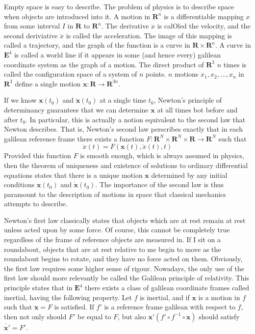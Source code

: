 Empty space is easy to describe. The problem of physics is to describe space when objects are introduced into it. A motion in $\mathbf{R}^n$ is a differentiable mapping $x$ from some interval $I$ in $\mathbf{R}$ to $\mathbf{R}^n$. The derivative $\dot{x}$ is calOled the velocity, and the second deriviative $\ddot{x}$ is called the acceleration. The image of this mapping is called a trajectory, and the graph of the function is a curve in $\mathbf{R} \times \mathbf{R}^n$. A curve in $\mathbf{E}^4$ is called a world line if it appears in some (and hence every) galilean coordinate system as the graph of a motion. The direct product of $\mathbf{R}^3$ $n$ times is called the configuration space of a system of $n$ points. $n$ motions $x_1, x_2, \dots, x_n$ in $\mathbf{R}^3$ define a single motion $\mathbf{x}:\mathbf{R} \to \mathbf{R}^{3n}$.

If we know $\mathbf{x}(t_0)$ and $\dot{\mathbf{x}}(t_0)$ at a single time $t_0$, Newton's principle of determinancy guarantees that we can determine $\mathbf{x}$ at all times bot before and after $t_0$. In particular, this is actually a notion equivalent to the second law that Newton describes. That is, Newton's second law perscribes exactly that in each galilean reference frame there exists a function $F:\mathbf{R}^N \times \mathbf{R}^N \times \mathbf{R} \to \mathbf{R}^N$ such that
%
\[ \ddot{x}(t) = F(\mathbf{x}(t), \dot{x}(t), t) \]
%
Provided this function $F$ is smooth enough, which is always assumed in physics, then the theorem of uniqueness and existence of solutions to ordinary differential equations states that there is a unique motion $\mathbf{x}$ determined by any initial conditions $\mathbf{x}(t_0)$ and $\dot{\mathbf{x}}(t_0)$. The importance of the second law is thus paramount to the description of motions in space that classical mechanics attempts to describe.

Newton's first law classically states that objects which are at rest remain at rest unless acted upon by some force. Of course, this cannot be completely true regardless of the frame of reference objects are measured in. If I sit on a roundabout, objects that are at rest relative to me begin to move as the roundabout begins to rotate, and they have no force acted on them. Obviously, the first law requires some higher sense of rigour. Nowadays, the only use of the first law should more relevantly be called the Galilean principle of relativity. This principle states that in $\mathbf{E}^4$ there exists a class of galilean coordinate frames called inertial, having the following property. Let $f$ is inertial, and if $\mathbf{x}$ is a motion in $f$ such that $\ddot{\mathbf{x}} = F$ is satisfied. If $f'$ is a reference frame galilean with respect to $f$, then not only should $F'$ be equal to $F$, but also $\mathbf{x}' (f' \circ f^{-1} \circ \mathbf{x})$ should satisfy $\ddot{\mathbf{x}'} = F'$.


